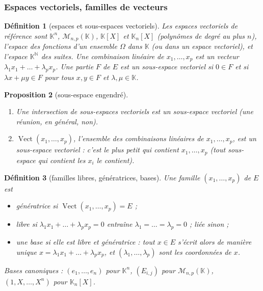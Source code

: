 \documentclass[a4paper,11pt]{article}
\numberwithin{equation}{section}
\numberwithin{figure}{section}
\numberwithin{table}{section}
\theoremstyle{enonce}
\newtheorem{definition}{Définition}[section]
\newtheorem{proposition}[definition]{Proposition}
\theoremstyle{exemple}
\theoremstyle{remarque}
\newcommand{\K}{\mathbb{K}}
\newcommand{\N}{\mathbb{N}}
\newcommand{\vect}{\operatorname{Vect}}
\begin{document}
\subsubsection*{Espaces vectoriels, familles de vecteurs}

\begin{definition}[espaces et sous-espaces vectoriels]
Les espaces vectoriels de référence sont $\K^n$, $\mathcal M_{n,p}(\K)$, $\K[X]$ et $\K_n[X]$ (polynômes de degré au plus $n$),
l'espace des fonctions d'un ensemble $\Omega$ dans $\K$ (ou dans un espace vectoriel), et l'espace $\K^\N$ des suites. Une
\emph{combinaison linéaire} de $x_1,\dots,x_p$ est un vecteur $\lambda_1x_1+\dots+\lambda_px_p$. Une partie $F$ de $E$ est un
\emph{sous-espace vectoriel} si $0\in F$ et si $\lambda x+\mu y\in F$ pour tous $x,y\in F$ et $\lambda,\mu\in\K$.
\end{definition}

\begin{proposition}[sous-espace engendré]\label{r:vect}
\begin{enumerate}
\item Une intersection de sous-espaces vectoriels est un sous-espace vectoriel (une réunion, en général, non).
\item $\vect(x_1,\dots,x_p)$, l'ensemble des combinaisons linéaires de $x_1,\dots,x_p$, est un sous-espace vectoriel : c'est
le plus petit qui contient $x_1,\dots,x_p$ (tout sous-espace qui contient les $x_i$ le contient).
\end{enumerate}
\end{proposition}

\begin{definition}[familles libres, génératrices, bases]
Une famille $(x_1,\dots,x_p)$ de $E$ est
\begin{itemize}
\item \emph{génératrice} si $\vect(x_1,\dots,x_p)=E$ ;
\item \emph{libre} si $\lambda_1x_1+\dots+\lambda_px_p=0$ entraîne $\lambda_1=\dots=\lambda_p=0$ ; \emph{liée} sinon ;
\item une \emph{base} si elle est libre et génératrice : tout $x\in E$ s'écrit alors de manière unique
$x=\lambda_1x_1+\dots+\lambda_px_p$, et $(\lambda_1,\dots,\lambda_p)$ sont les \emph{coordonnées} de $x$.
\end{itemize}
Bases canoniques : $(e_1,\dots,e_n)$ pour $\K^n$, $(E_{i,j})$ pour $\mathcal M_{n,p}(\K)$, $(1,X,\dots,X^n)$ pour $\K_n[X]$.
\end{definition}
\end{document}
